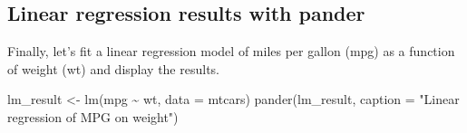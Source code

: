 \documentclass[
]{book}
\newenvironment{Shaded}{\begin{snugshade}}{\end{snugshade}}
\newcommand{\AttributeTok}[1]{\textcolor[rgb]{0.77,0.63,0.00}{#1}}
\newcommand{\FunctionTok}[1]{\textcolor[rgb]{0.00,0.00,0.00}{#1}}
\newcommand{\NormalTok}[1]{#1}
\newcommand{\OtherTok}[1]{\textcolor[rgb]{0.56,0.35,0.01}{#1}}
\newcommand{\SpecialCharTok}[1]{\textcolor[rgb]{0.00,0.00,0.00}{#1}}
\newcommand{\StringTok}[1]{\textcolor[rgb]{0.31,0.60,0.02}{#1}}
\begin{document}
\hypertarget{linear-regression-results-with-pander}{%
\subsection{Linear regression results with pander}\label{linear-regression-results-with-pander}}

Finally, let's fit a linear regression model of miles per gallon (mpg) as a function of weight (wt) and display the results.

\begin{Shaded}
\begin{Highlighting}[]
\NormalTok{lm\_result }\OtherTok{\textless{}{-}} \FunctionTok{lm}\NormalTok{(mpg }\SpecialCharTok{\textasciitilde{}}\NormalTok{ wt, }\AttributeTok{data =}\NormalTok{ mtcars)}
\FunctionTok{pander}\NormalTok{(lm\_result, }\AttributeTok{caption =} \StringTok{"Linear regression of MPG on weight"}\NormalTok{)}
\end{Highlighting}
\end{Shaded}


  
\end{document}
